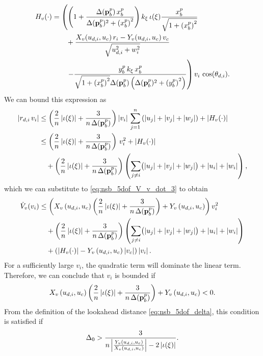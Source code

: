 \begin{equation}
    \begin{split}
        H_v(\cdot) & = \left(\left(1 + \frac{\Delta(\mathbf{p}_b^p)\,x_b^p}{\Delta(\mathbf{p}_b^p)^2 + \left(x_b^p\right)^2}\right)k_{\xi}\,\iota(\xi)\frac{x_b^p}{\sqrt{1+\left(x_b^p\right)^2}} \right. \\
        &\qquad + \frac{X_v(u_{d,i}, u_c)\,r_i - Y_v(u_{d,i}, u_c)\,v_c}{\sqrt{u_{d,i}^2 + w_i^2}}  \\
        &\qquad \left. - \frac{y_b^p\,k_{\xi}\,x_b^p}{\sqrt{1+\left(x_b^p\right)^2}\Delta(\mathbf{p}_b^p)\left(\Delta(\mathbf{p}_b^p)^2 + \left(y_b^p\right)^2\right)}  \right) v_i \, \cos(\theta_{d,i}).
    \end{split}
\end{equation}
We can bound this expression as
\begin{equation}
    \begin{split}
        \left|r_{d,i}\,v_i\right| &\leq \left(\frac{2}{n}\left|\iota(\xi)\right| + \frac{3}{n\,\Delta(\mathbf{p}_b^p)}\right)\left|v_i\right|\,\sum_{j=1}^n\left(\left|u_j\right| + \left|v_j\right| + \left|w_j\right|\right) + \left|H_v(\cdot)\right| \\
        &\leq \left(\frac{2}{n}\left|\iota(\xi)\right| + \frac{3}{n\,\Delta(\mathbf{p}_b^p)}\right)\,v_i^2 + \left|H_v(\cdot)\right| \\
        &\quad + \left(\frac{2}{n}\left|\iota(\xi)\right| + \frac{3}{n\,\Delta(\mathbf{p}_b^p)}\right)\left(\sum_{j \neq i}\bigl(\left|u_j\right| + \left|v_j\right| + \left|w_j\right|\bigr) + \left|u_i\right| + \left|w_i\right|\right),
    \end{split}
\end{equation}
which we can substitute to \eqref{eq:nsb_5dof_V_v_dot_3} to obtain
\begin{equation}
    \begin{split}
        \dot{V}_v(v_i) &\leq \left(X_v\left(u_{d,i}, u_c\right)\left(\frac{2}{n}\left|\iota(\xi)\right| + \frac{3}{n\,\Delta(\mathbf{p}_b^p)}\right) + Y_v\left(u_{d,i}, u_c\right)\right)v_i^2 \\
        & \quad + \left(\frac{2}{n}\left|\iota(\xi)\right| + \frac{3}{n\,\Delta(\mathbf{p}_b^p)}\right)\left(\sum_{j \neq i}\bigl(\left|u_j\right| + \left|v_j\right| + \left|w_j\right|\bigr) + \left|u_i\right| + \left|w_i\right|\right) \\
        & \quad + \left(\left|H_v(\cdot)\right| - Y_v\left(u_{d,i}, u_c\right)\left|v_c\right|\right) \left|v_i\right|.
    \end{split}
\end{equation}
For a sufficiently large $v_i$, the quadratic term will dominate the linear term.
Therefore, we can conclude that $v_i$ is bounded if 
\begin{equation}
    X_v\left(u_{d,i}, u_c\right)\left(\frac{2}{n}\left|\iota(\xi)\right| + \frac{3}{n\,\Delta(\mathbf{p}_b^p)}\right) + Y_v\left(u_{d,i}, u_c\right) < 0.
\end{equation}
From the definition of the lookahead distance \eqref{eq:nsb_5dof_delta}, this condition is satisfied if
\begin{equation}
    \Delta_0 > \frac{3}{n\left|\frac{Y_v\left(u_{d,i}, u_c\right)}{X_v\left(u_{d,i}, u_c\right)}\right| - 2\left|\iota(\xi)\right|}.
\end{equation}

